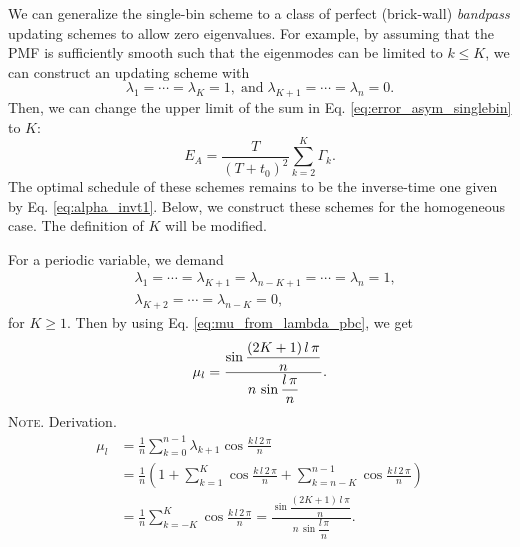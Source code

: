 \documentclass[reprint, floatfix]{revtex4-1}
\newcommand{\note}[1]{{\color{DarkGreen}\footnotesize \textsc{Note.} #1}}
\begin{document}
We can generalize
the single-bin scheme to a class of
perfect (brick-wall) \emph{bandpass} updating schemes
to allow zero eigenvalues.
%
For example,
by assuming
that the PMF is sufficiently smooth
such that the eigenmodes can be limited to $k \le K$,
%
we can construct an updating scheme with
$$
\lambda_1 = \cdots = \lambda_K = 1,
\mathrm{\; and \;}
\lambda_{K+1} = \cdots = \lambda_n = 0.
$$
%
Then,
we can change the upper limit of the sum in
Eq. \eqref{eq:error_asym_singlebin} to $K$:
%
%
\begin{equation}
  E_A
  =
  \frac {       T     }
        { (T + t_0)^2 }
  \sum_{ k = 2 }^K
    \Gamma_k.
\label{eq:error_asym_sinc}
\end{equation}
%
The optimal schedule of these schemes
remains to be the inverse-time one
given by Eq. \eqref{eq:alpha_invt1}.
%
Below, we construct these schemes for
the homogeneous case.
%
The definition of $K$ will be modified.

For a periodic variable, we demand
%
$$
\begin{aligned}
&
\lambda_1 = \cdots = \lambda_{K+1}
= \lambda_{n-K+1} = \cdots = \lambda_n = 1,
\\
&
\lambda_{K+2} = \cdots = \lambda_{n-K} = 0,
\end{aligned}
$$
for $K \ge 1$.
%
Then by using
Eq. \eqref{eq:mu_from_lambda_pbc},
we get
\begin{equation}
  \mu_l
  =
  \frac{
    \sin
    \dfrac{ (2 K + 1) \, l \, \pi }
         {              n        }
  }
  {
    n \, \sin \dfrac{ l \, \pi } { n }
  }
  .
\notag
\end{equation}
\note{Derivation.
$$
\begin{aligned}
\mu_l
&=
\frac 1 n \sum_{k = 0}^{n-1} \lambda_{k+1} \cos \frac{ k \, l \, 2 \, \pi } { n }
\\
&=
\frac{1}{n}
\left(
  1 +
  \sum_{k=1}^K
  \cos \frac { k \, l \, 2 \, \pi } { n }
  +
  \sum_{k=n-K}^{n-1}
  \cos \frac { k \, l \, 2 \, \pi } { n }
\right)
\\
&=
\frac 1 n
\sum_{k=-K}^K
\cos \frac { k \, l \, 2 \, \pi } { n }
=
  \frac{
    \sin
    \dfrac{ (2 K + 1) \, l \, \pi }
         {              n        }
  }
  {
    n \, \sin \dfrac{ l \, \pi } { n }
  }
.
\end{aligned}
$$
}
\end{document}
